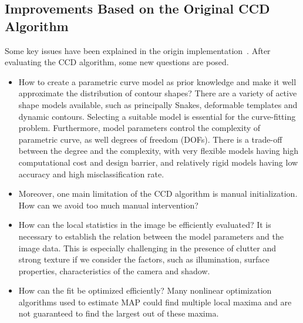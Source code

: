 

\subsection{Improvements Based on the Original CCD Algorithm}
\label{sec:prob}
Some key issues have been explained in the origin
implementation~\cite{hanek2004contracting}.
After evaluating the CCD algorithm, some new questions are posed.

\begin{itemize}
\item How to create a parametric curve model as prior knowledge and
  make it well approximate the distribution of contour shapes? 
There are a variety of active shape models available, such as principally Snakes,
  deformable templates and dynamic contours. Selecting a suitable model
  is essential for the curve-fitting
  problem. Furthermore, 
  model parameters control the complexity of parametric curve,
  as well degrees of freedom (DOFs). There is a trade-off between the
  degree and the complexity, with very flexible models having high
  computational cost and design barrier, and relatively rigid models
  having low accuracy and high misclassification rate. 

\item Moreover, one
  main limitation of the CCD algorithm is manual initialization. How can
  we avoid too much manual intervention?

\item How can the local statistics in the image be efficiently
  evaluated? It is necessary to establish the relation between the
  model parameters
  and the image data. This is especially challenging in the presence
  of clutter and strong texture if we consider the factors, such as
  illumination, surface properties, characteristics of the camera and
  shadow. 

\item How can the fit be optimized efficiently? Many
  nonlinear optimization algorithms used to estimate MAP could find
  multiple local maxima and are not guaranteed to find the largest
  out of these maxima.
\end{itemize}


